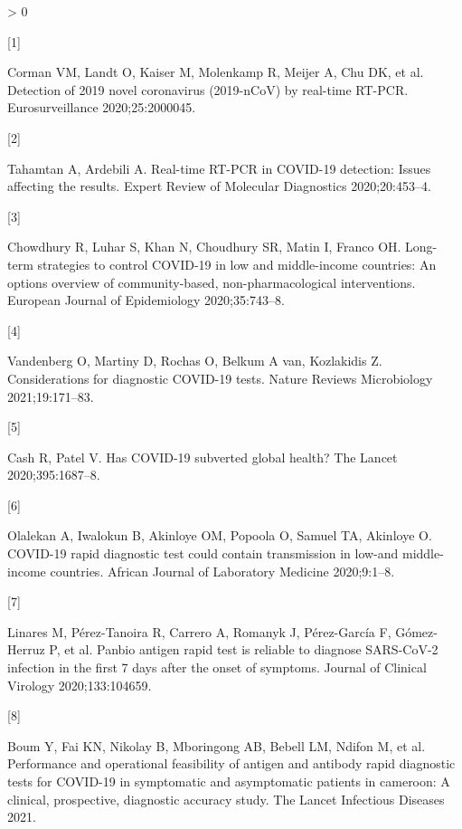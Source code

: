 \documentclass[]{elsarticle} %
\newlength{\cslhangindent}
\newlength{\csllabelwidth}
\newenvironment{CSLReferences}[2] %
 {%
  \setlength{\parindent}{0pt}
  \ifodd #1 \everypar{\setlength{\hangindent}{\cslhangindent}}\ignorespaces\fi
  \ifnum #2 > 0
  \setlength{\parskip}{#2\baselineskip}
  \fi
 }%
 {}
\newcommand{\CSLLeftMargin}[1]{\parbox[t]{\csllabelwidth}{#1}}
\newcommand{\CSLRightInline}[1]{\parbox[t]{\linewidth - \csllabelwidth}{#1}\break}
\begin{document}
\hypertarget{refs}{}
\begin{CSLReferences}{0}{0}
\leavevmode\hypertarget{ref-corman2020detection}{}%
\CSLLeftMargin{{[}1{]} }
\CSLRightInline{Corman VM, Landt O, Kaiser M, Molenkamp R, Meijer A, Chu
DK, et al. Detection of 2019 novel coronavirus (2019-nCoV) by real-time
RT-PCR. Eurosurveillance 2020;25:2000045.}

\leavevmode\hypertarget{ref-tahamtan2020real}{}%
\CSLLeftMargin{{[}2{]} }
\CSLRightInline{Tahamtan A, Ardebili A. Real-time RT-PCR in COVID-19
detection: Issues affecting the results. Expert Review of Molecular
Diagnostics 2020;20:453--4.}

\leavevmode\hypertarget{ref-chowdhury2020long}{}%
\CSLLeftMargin{{[}3{]} }
\CSLRightInline{Chowdhury R, Luhar S, Khan N, Choudhury SR, Matin I,
Franco OH. Long-term strategies to control COVID-19 in low and
middle-income countries: An options overview of community-based,
non-pharmacological interventions. European Journal of Epidemiology
2020;35:743--8.}

\leavevmode\hypertarget{ref-vandenberg2021considerations}{}%
\CSLLeftMargin{{[}4{]} }
\CSLRightInline{Vandenberg O, Martiny D, Rochas O, Belkum A van,
Kozlakidis Z. Considerations for diagnostic COVID-19 tests. Nature
Reviews Microbiology 2021;19:171--83.}

\leavevmode\hypertarget{ref-cash2020has}{}%
\CSLLeftMargin{{[}5{]} }
\CSLRightInline{Cash R, Patel V. Has COVID-19 subverted global health?
The Lancet 2020;395:1687--8.}

\leavevmode\hypertarget{ref-olalekan2020covid}{}%
\CSLLeftMargin{{[}6{]} }
\CSLRightInline{Olalekan A, Iwalokun B, Akinloye OM, Popoola O, Samuel
TA, Akinloye O. COVID-19 rapid diagnostic test could contain
transmission in low-and middle-income countries. African Journal of
Laboratory Medicine 2020;9:1--8.}

\leavevmode\hypertarget{ref-linares2020panbio}{}%
\CSLLeftMargin{{[}7{]} }
\CSLRightInline{Linares M, Pérez-Tanoira R, Carrero A, Romanyk J,
Pérez-García F, Gómez-Herruz P, et al. Panbio antigen rapid test is
reliable to diagnose SARS-CoV-2 infection in the first 7 days after the
onset of symptoms. Journal of Clinical Virology 2020;133:104659.}

\leavevmode\hypertarget{ref-boum2021performance}{}%
\CSLLeftMargin{{[}8{]} }
\CSLRightInline{Boum Y, Fai KN, Nikolay B, Mboringong AB, Bebell LM,
Ndifon M, et al. Performance and operational feasibility of antigen and
antibody rapid diagnostic tests for COVID-19 in symptomatic and
asymptomatic patients in cameroon: A clinical, prospective, diagnostic
accuracy study. The Lancet Infectious Diseases 2021.}


\end{CSLReferences}
\end{document}
